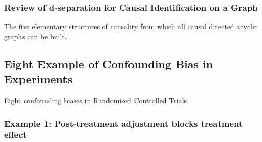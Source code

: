 \documentclass[
  single column]{article}
\begin{document}
\subsubsection{Review of d-separation for Causal Identification on a
Graph}\label{review-of-d-separation-for-causal-identification-on-a-graph}

\begin{table}

\caption{\label{tbl-fiveelementary}The five elementary structures of
causality from which all causal directed acyclic graphs can be built.}

\centering{

\terminologydirectedgraph

}

\end{table}%

\subsection{Eight Example of Confounding Bias in
Experiments}\label{eight-example-of-confounding-bias-in-experiments}

\begin{table}

\caption{\label{tbl-terminologyelconfoundersexperiments}Eight
confounding biases in Randomised Controlled Trials.}

\centering{

\terminologyelconfoundersexperiments

}

\end{table}%

\subsubsection{Example 1: Post-treatment adjustment blocks treatment
effect}\label{example-1-post-treatment-adjustment-blocks-treatment-effect}
\end{document}
